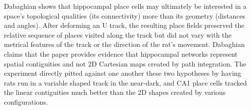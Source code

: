\documentclass[onecollarge,runningheads]{svjour2}
\begin{document}
Dabaghian \cite{dabaghian2014reconceiving} shows that hippocampal place cells may ultimately be interested in a space's topological qualities (its connectivity) more than its geometry (distances and angles). After deforming an U track, the resulting place fields preserved the relative sequence of places visited along the track but did not vary with the metrical features of the track or the direction of the rat's movement.
Dabaghian claims that the paper provides evidence that hippocampal networks represent spatial contiguities and not 2D Cartesian maps created by path integration. The experiment directly pitted against one another these two hypotheses by having rats run in a variable shaped track in the near-dark, and CA1 place cells tracked the linear contiguities much better than the 2D shapes created by various configurations.

\begin{acknowledgements}

\end{acknowledgements}


\end{document}
